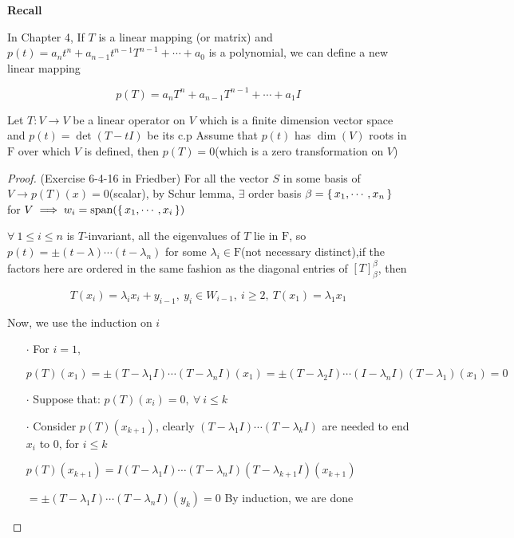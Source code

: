 \textbf{Recall}

In Chapter 4, If $T$ is a linear mapping (or matrix) and $p(t) = a_nt^n + a_{n-1}t^{n-1}T^{n-1} + \cdots + a_0$ is a polynomial, we can define a new linear mapping

$$p(T) = a_nT^n + a_{n-1}T^{n-1}+\cdots + a_1I$$

\begin{thm*}
	Let $T:V \rightarrow V$ be a linear operator on $V$ which is a finite dimension vector space and $p(t)=\det(T - tI)$ be its c.p
	Assume that $p(t)$ has $\dim(V)$ roots in $\mathrm F$ over which $V$ is defined, then $p(T) = 0$(which is a zero transformation on $V$)
\end{thm*}

\begin{proof}(Exercise 6-4-16 in Friedber)
	For all the vector $S$ in some basis of $V \rightarrow p(T)(x) = 0$(scalar), by Schur lemma, $\exists$ order basis $\beta = \left\{ \,x_1,\cdots,x_n \,\right\}$ for $V \implies w_i = \text{span($\left\{ \,x_1,\cdots,x_i \,\right\}$)} $
	
	$\forall ~1 \leq i \leq n $ is $T$-invariant, all the eigenvalues of $T$ lie in $\mathrm F$, so $p(t) = \pm (t - \lambda)\cdots(t-\lambda_n)$ for some $\lambda_i \in \mathrm F$(not necessary distinct),if the factors here are ordered in the same fashion as the diagonal entries of $[T]^{\beta}_{\beta}$, then
	
	$$T(x_i) = \lambda_ix_i+y_{i-1},~y_i \in W_{i-1},~i \geq 2,~T(x_1) = \lambda_1x_1$$
	
	Now, we use the induction on $i$
	
	\begin{enumerate}
		\item[$\cdot$] For $i = 1,$
		
		$p(T)(x_1) = \pm(T - \lambda_1 I)\cdots(T - \lambda_n I)(x_1) = \pm(T- \lambda_2 I)\cdots(I-\lambda_n I)(T - \lambda_1)(x_1) = 0$
		\item[$\cdot$] Suppose that: $p(T)(x_i)=0,~\forall~i \leq k$
		
		\item[$\cdot$] Consider $p(T)(x_{k+1})$, clearly $(T - \lambda_1 I)\cdots(T - \lambda_k I)$ are needed to end $x_i$ to $0$, for $i \leq k$
		
		$p(T)(x_{k+1}) = I(T - \lambda_1 I)\cdots(T - \lambda_n I)(T - \lambda_{k+1}I)(x_{k+1}) $
		
		$= \pm (T - \lambda_1 I)\cdots(T - \lambda_n I)(y_k) = 0$ By induction, we are done
	\end{enumerate}
\end{proof}

